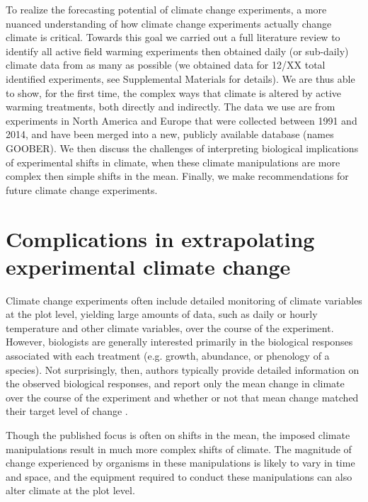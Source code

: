 \documentclass{article}
\begin{document}
\par To realize the forecasting potential of climate change experiments, a more nuanced understanding of how climate change experiments actually change climate is critical. Towards this goal we carried out a full literature review to identify all active field warming experiments then obtained daily (or sub-daily) climate data from as many as possible (we obtained data for 12/XX total identified experiments, see Supplemental Materials for details). We are thus able to show, for the first time, the complex ways that climate is altered by active warming treatments, both directly and indirectly. The data we use are from experiments in North America and Europe that were collected between 1991 and 2014, and have been merged into a new, publicly available database (names GOOBER). We then discuss the challenges of interpreting biological implications of experimental shifts in climate, when these climate manipulations are more complex then simple shifts in the mean. Finally, we make recommendations for future climate change experiments.

\section* {Complications in extrapolating experimental climate change}
Climate change experiments often include detailed monitoring of climate variables at the plot level, yielding large amounts of data, such as daily or hourly temperature and other climate variables, over the course of the experiment. However, biologists are generally interested primarily in the biological responses associated with each treatment (e.g. growth, abundance, or phenology of a species). Not surprisingly, then, authors typically provide detailed information on the observed biological responses, and report only the mean change in climate over the course of the experiment and whether or not that mean change matched their target level of change \citep{price1998,clark2014a,clark2014b,rollinson2012}. 

\par Though the published focus is often on shifts in the mean, the imposed climate manipulations result in much more complex shifts of climate. The magnitude of change experienced by organisms in these manipulations is likely to vary in time and space, and the equipment required to conduct these manipulations can also alter climate at the plot level. %
\end{document}
